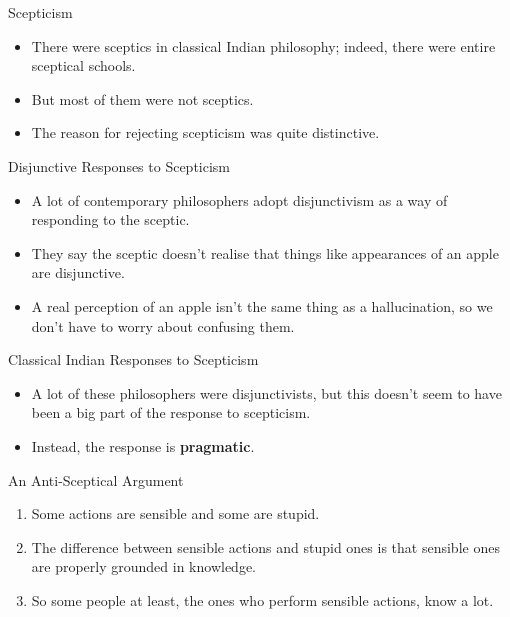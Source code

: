 \documentclass[
  17pt,
  letterpaper,
  ignorenonframetext,
  aspectratio=169,
]{beamer}
\providecommand{\tightlist}{%
  \setlength{\itemsep}{0pt}\setlength{\parskip}{0pt}}\usepackage{longtable,booktabs,array}
\begin{document}
\begin{frame}{Scepticism}
\protect\hypertarget{scepticism-1}{}
\begin{itemize}[<+->]
\tightlist
\item
  There were sceptics in classical Indian philosophy; indeed, there were
  entire sceptical schools.
\item
  But most of them were not sceptics.
\item
  The reason for rejecting scepticism was quite distinctive.
\end{itemize}
\end{frame}

\begin{frame}{Disjunctive Responses to Scepticism}
\protect\hypertarget{disjunctive-responses-to-scepticism}{}
\begin{itemize}[<+->]
\tightlist
\item
  A lot of contemporary philosophers adopt disjunctivism as a way of
  responding to the sceptic.
\item
  They say the sceptic doesn't realise that things like appearances of
  an apple are disjunctive.
\item
  A real perception of an apple isn't the same thing as a hallucination,
  so we don't have to worry about confusing them.
\end{itemize}
\end{frame}

\begin{frame}{Classical Indian Responses to Scepticism}
\protect\hypertarget{classical-indian-responses-to-scepticism}{}
\begin{itemize}[<+->]
\tightlist
\item
  A lot of these philosophers were disjunctivists, but this doesn't seem
  to have been a big part of the response to scepticism.
\item
  Instead, the response is \textbf{pragmatic}.
\end{itemize}
\end{frame}

\begin{frame}{An Anti-Sceptical Argument}
\protect\hypertarget{an-anti-sceptical-argument}{}
\begin{enumerate}[<+->]
\tightlist
\item
  Some actions are sensible and some are stupid.
\item
  The difference between sensible actions and stupid ones is that
  sensible ones are properly grounded in knowledge.
\item
  So some people at least, the ones who perform sensible actions, know a
  lot.
\end{enumerate}
\end{frame}
\end{document}
